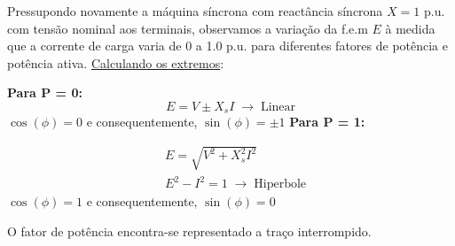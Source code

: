 \hspace{-1.5em}\begin{minipage}[c]{0.45\linewidth}
\noindent Pressupondo novamente a máquina síncrona com reactância síncrona $X = 1$ p.u. com tensão nominal aos terminais, observamos a variação da f.e.m $E$ à medida que a corrente de carga varia de 0 a 1.0 p.u. para diferentes fatores de potência e potência ativa. \underline{Calculando os extremos}:

\vspace{1 em}
\noindent\textbf{Para P = 0:}
$$
    \boxed{E = V \pm X_s I}\; \rightarrow\; \text{Linear}
$$
$\cos(\phi) = 0$ e consequentemente, $\sin(\phi) = \pm 1$
\noindent\textbf{Para P = 1:}

$$
    \begin{aligned}
            &E = \sqrt{V^2 + X_s^2 I^2}\\
            &\boxed{E^2 - I^2 = 1}\; \rightarrow\; \text{Hiperbole}
    \end{aligned}
$$
$\cos(\phi) = 1$ e consequentemente, $\sin(\phi) = 0$

\vspace{0.5em}
\noindent O fator de potência encontra-se representado a traço interrompido.

\end{minipage}
